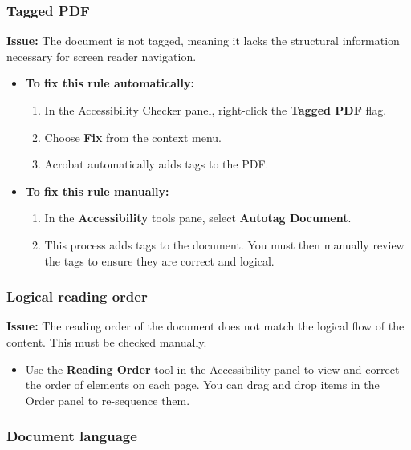 \subsubsection{Tagged PDF}
\label{ssubsec:pdf-tagged}

\textbf{Issue:} The document is not tagged, meaning it lacks the structural information necessary for screen reader navigation.

\begin{itemize}
	\item \textbf{To fix this rule automatically:}
	      \begin{enumerate}
		      \item In the Accessibility Checker panel, right-click the \textbf{Tagged PDF} flag.
		      \item Choose \textbf{Fix} from the context menu.
		      \item Acrobat automatically adds tags to the PDF.
	      \end{enumerate}
	\item \textbf{To fix this rule manually:}
	      \begin{enumerate}
		      \item In the \textbf{Accessibility} tools pane, select \textbf{Autotag Document}.
		      \item This process adds tags to the document. You must then manually review the tags to ensure they are correct and logical.
	      \end{enumerate}
\end{itemize}

\subsubsection{Logical reading order}
\label{ssubsec:pdf-reading-order}

\textbf{Issue:} The reading order of the document does not match the logical flow of the content. This must be checked manually.

\begin{itemize}
	\item Use the \textbf{Reading Order} tool in the Accessibility panel to view and correct the order of elements on each page. You can drag and drop items in the Order panel to re-sequence them.
\end{itemize}

\subsubsection{Document language}
\label{ssubsec:pdf-language}


